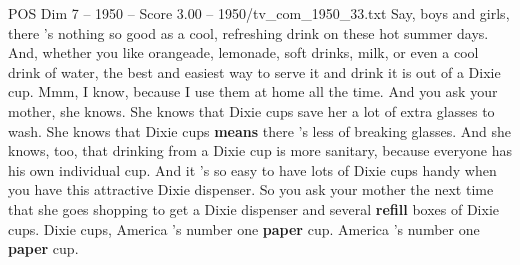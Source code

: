 \begin{textsample}{POS Dim 7 – 1950 – Score 3.00 – 1950/tv\_com\_1950\_33.txt}  \label{ex:f7_pos_008}
Say, boys and girls, there 's nothing so good as a cool, refreshing drink on these hot summer days.
And, whether you like orangeade, lemonade, soft drinks, milk, or even a cool drink of water, the best and easiest way to serve it and drink it is out of a Dixie cup.
Mmm, I know, because I use them at home all the time.
And you ask your mother, she knows.
She knows that Dixie cups save her a lot of extra glasses to wash.
She knows that Dixie cups \textbf{means} there 's less of breaking glasses.
And she knows, too, that drinking from a Dixie cup is more sanitary, because everyone has his own individual cup.
And it 's so easy to have lots of Dixie cups handy when you have this attractive Dixie dispenser.
So you ask your mother the next time that she goes shopping to get a Dixie dispenser and several \textbf{refill} boxes of Dixie cups.
Dixie cups, America 's number one \textbf{paper} cup.
America 's number one \textbf{paper} cup.

\end{textsample}
